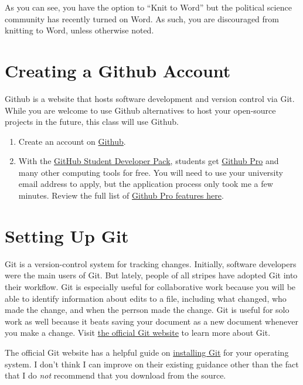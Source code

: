 \documentclass[
]{book}
\begin{document}
As you can see, you have the option to ``Knit to Word'' but the political science community has recently turned on Word. As such, you are discouraged from knitting to Word, unless otherwise noted.

\hypertarget{create-Github}{%
\section{Creating a Github Account}\label{create-Github}}

Github is a website that hosts software development and version control via Git. While you are welcome to use Github alternatives to host your open-source projects in the future, this class will use Github.

\begin{enumerate}
\def\labelenumi{\arabic{enumi}.}
\item
  Create an account on \href{https://github.com/}{Github}.
\item
  With the \href{https://education.github.com/pack}{GitHub Student Developer Pack}, students get \href{https://education.github.com/discount_requests/student_application}{Github Pro} and many other computing tools for free. You will need to use your university email address to apply, but the application process only took me a few minutes. Review the full list of \href{https://docs.github.com/en/github/getting-started-with-github/githubs-products\#github-pro}{Github Pro features here}.
\end{enumerate}

\hypertarget{setup-Git}{%
\section{Setting Up Git}\label{setup-Git}}

Git is a version-control system for tracking changes. Initially, software developers were the main users of Git. But lately, people of all stripes have adopted Git into their workflow. Git is especially useful for collaborative work because you will be able to identify information about edits to a file, including what changed, who made the change, and when the perrson made the change. Git is useful for solo work as well because it beats saving your document as a new document whenever you make a change. Visit \href{https://git-scm.com/}{the official Git website} to learn more about Git.

The official Git website has a helpful guide on \href{https://git-scm.com/book/en/v2/Getting-Started-Installing-Git}{installing Git} for your operating system. I don't think I can improve on their existing guidance other than the fact that I do \emph{not} recommend that you download from the source.
\end{document}
